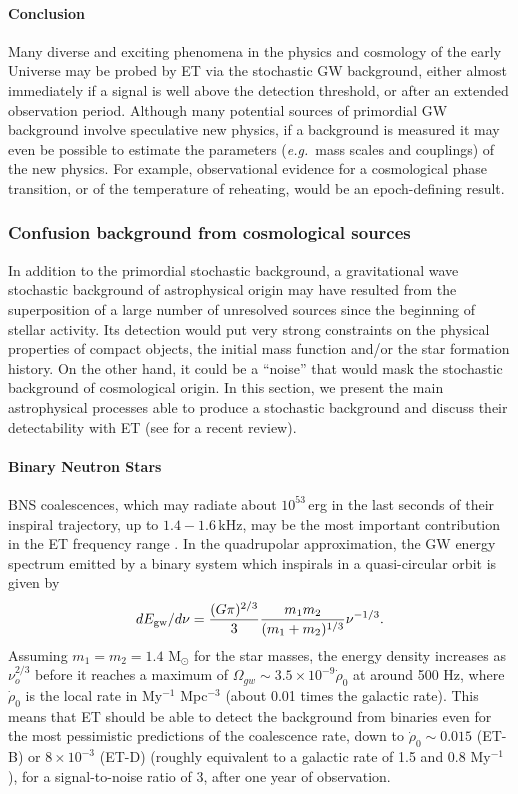 \paragraph{Conclusion}

Many diverse and exciting phenomena in the physics and cosmology of the early Universe may be probed by ET via the stochastic GW background, either almost immediately if a signal is well above the detection threshold, or after an extended observation period. Although many potential sources of primordial GW background involve speculative new physics, if a background is measured it may even be possible to estimate the parameters ({\em e.g.}\ mass scales and couplings) of the new physics. For example, observational evidence for a cosmological phase transition, or of the temperature of reheating, would be an epoch-defining result.


\subsubsection{Confusion background from cosmological sources}
\label{astro_stochastic}
In addition to the primordial stochastic background, a gravitational wave stochastic background of astrophysical origin may have resulted from the superposition of a large number of unresolved sources since the beginning of stellar activity. Its detection would put very strong constraints on the physical properties of compact objects, the initial mass function and/or the star formation history. On
the other hand, it could be a ``noise'' that would mask the stochastic background of cosmological
origin. In this section, we present the main astrophysical processes able to produce a stochastic
background and discuss their detectability with ET (see \cite{Regimbau2011RAA} for a recent review). 

\paragraph{Binary Neutron Stars}
BNS coalescences, which may radiate about $10^{53}$\,erg in the last seconds of their inspiral trajectory, up to $1.4-1.6$\,kHz, may be the most important contribution in the ET frequency range \cite{Schneider:2000sg, Regimbau:2006,Regimbau:2007,Regimbau:2008}.
In the quadrupolar approximation, the GW energy spectrum emitted by a binary system which inspirals in a quasi-circular orbit is given by
\begin{equation}
dE_{\rm gw}/{d\nu} = \frac{(G \pi)^{2/3}}{3} \frac{m_1m_2}{(m_1+m_2)^{1/3}} \nu^{-1/3}.
\end{equation}
Assuming $m_1=m_2=1.4$ M$_\odot$ for the star masses,  the energy density increases as $\nu_o^{2/3}$ before it reaches a maximum of $\Omega_{gw} \sim 3.5 \times 10^{-9} \dot{\rho}_0$ at around 500 Hz, where $\dot{\rho}_0$ is the local rate in My$^{-1}$ Mpc$^{-3}$ (about 0.01 times the galactic rate).
This means that ET should be able to detect the background from binaries even for the most pessimistic predictions of the coalescence rate, down to $\dot{\rho}_0 \sim 0.015$ (ET-B) or $8 \times 10^{-3}$ (ET-D) (roughly equivalent to a galactic rate of 1.5 and 0.8 My$^{-1}$), for a signal-to-noise ratio of 3, after one year of observation.

